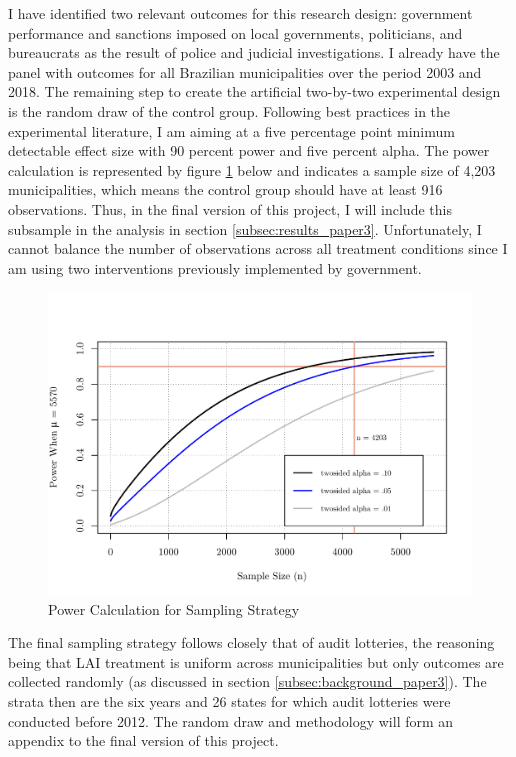 \documentclass[11pt]{article}
\begin{document}
I have identified two relevant outcomes for this research design: government performance and sanctions imposed on local governments, politicians, and bureaucrats as the result of police and judicial investigations. I already have the panel with outcomes for all Brazilian municipalities over the period 2003 and 2018. The remaining step to create the artificial two-by-two experimental design is the random draw of the control group. Following best practices in the experimental literature, I am aiming at a five percentage point minimum detectable effect size with 90 percent power and five percent alpha. The power calculation is represented by figure \ref{fig:power} below and indicates a sample size of 4,203 municipalities, which means the control group should have at least 916 observations. Thus, in the final version of this project, I will include this subsample in the analysis in section \ref{subsec:results_paper3}. Unfortunately, I cannot balance the number of observations across all treatment conditions since I am using two interventions previously implemented by government.
\clearpage
\begin{figure}
\centering
\caption{Power Calculation for Sampling Strategy}
\label{fig:power}
\includegraphics[trim = {0 0 0 2cm}, clip, scale = .75]{power.pdf}
\end{figure}

The final sampling strategy follows closely that of audit lotteries, the reasoning being that LAI treatment is uniform across municipalities but only  outcomes are collected randomly (as discussed in section \ref{subsec:background_paper3}). The strata then are the six years and 26 states for which audit lotteries were conducted before 2012. The random draw and methodology will form an appendix to the final version of this project.
\end{document}
